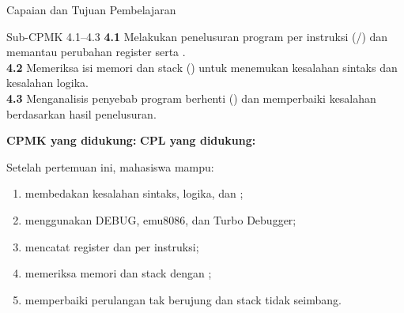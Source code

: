 \documentclass[aspectratio=169,11pt]{beamer}
\begin{document}

\begin{frame}{Capaian dan Tujuan Pembelajaran}
\begin{block}{Sub-CPMK 4.1--4.3}
\footnotesize
\textbf{4.1} Melakukan penelusuran program per instruksi
(/) dan memantau perubahan register
serta .\\
\textbf{4.2} Memeriksa isi memori dan stack () untuk
menemukan kesalahan sintaks dan kesalahan logika.\\
\textbf{4.3} Menganalisis penyebab program berhenti () dan
memperbaiki kesalahan berdasarkan hasil penelusuran.
\end{block}

\vspace{0.1em}
{\small\textbf{CPMK yang didukung:} \quad\textbullet\quad
\textbf{CPL yang didukung:} \par}

\vspace{0.15em}
\begin{exampleblock}{Setelah pertemuan ini, mahasiswa mampu:}
\footnotesize
\begin{enumerate}
    \item membedakan kesalahan sintaks, logika, dan ;
    \item menggunakan DEBUG, emu8086, dan Turbo Debugger;
    \item mencatat register dan  per instruksi;
    \item memeriksa memori dan stack dengan ;
    \item memperbaiki perulangan tak berujung dan stack tidak
          seimbang.
\end{enumerate}
\end{exampleblock}
\end{frame}
\end{document}
